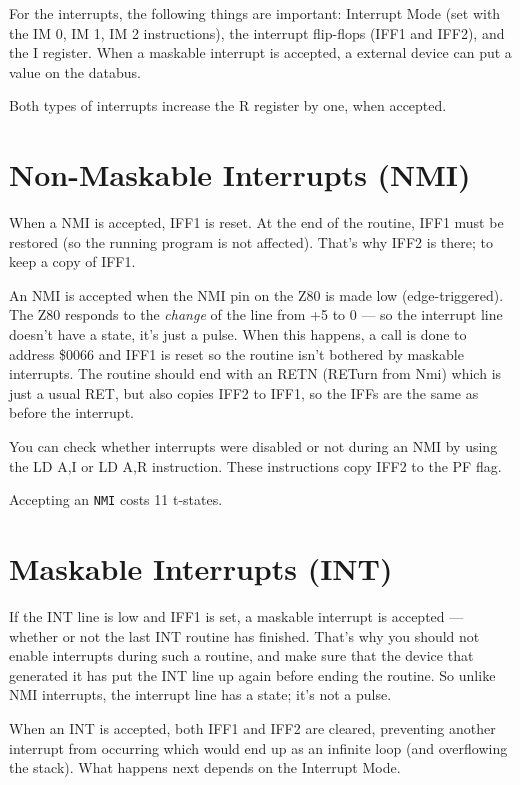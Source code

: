 \documentclass[oneside,a4paper]{book}
\begin{document}
For the interrupts, the following things are important: Interrupt Mode (set with the {\ttfamily IM 0, IM 1, IM 2} instructions), the interrupt flip-flops (IFF1 and IFF2), and the I register. When a maskable interrupt is accepted, a external device can put a value on the databus.

Both types of interrupts increase the R register by one, when accepted.


\section{Non-Maskable Interrupts (NMI)}

When a NMI is accepted, IFF1 is reset. At the end of the routine, IFF1 must be restored (so the running program is not affected). That's why IFF2 is there; to keep a copy of IFF1.

An NMI is accepted when the NMI pin on the Z80 is made low (edge-triggered). The Z80 responds to the {\em change} of the line from +5 to 0 --- so the interrupt line doesn't have a state, it's just a pulse. When this happens, a call is done to address \$0066 and IFF1 is reset so the routine isn't bothered by maskable interrupts. The routine should end with an {\ttfamily RETN} (RETurn from Nmi) which is just a usual RET, but also copies IFF2 to IFF1, so the IFFs are the same as before the interrupt.

You can check whether interrupts were disabled or not during an NMI by using the {\ttfamily LD A,I} or {\ttfamily LD A,R} instruction. These instructions copy IFF2 to the PF flag.

Accepting an {\tt NMI} costs 11 t-states.


\section{Maskable Interrupts (INT)}

If the INT line is low and IFF1 is set, a maskable interrupt is accepted --- whether or not the last INT routine has finished. That's why you should not enable interrupts during such a routine, and make sure that the device that generated it has put the INT line up again before ending the routine. So unlike NMI interrupts, the interrupt line has a state; it's not a pulse.

When an INT is accepted, both IFF1 and IFF2 are cleared, preventing another interrupt from occurring which would end up as an infinite loop (and overflowing the stack). What happens next depends on the Interrupt Mode.
\end{document}

